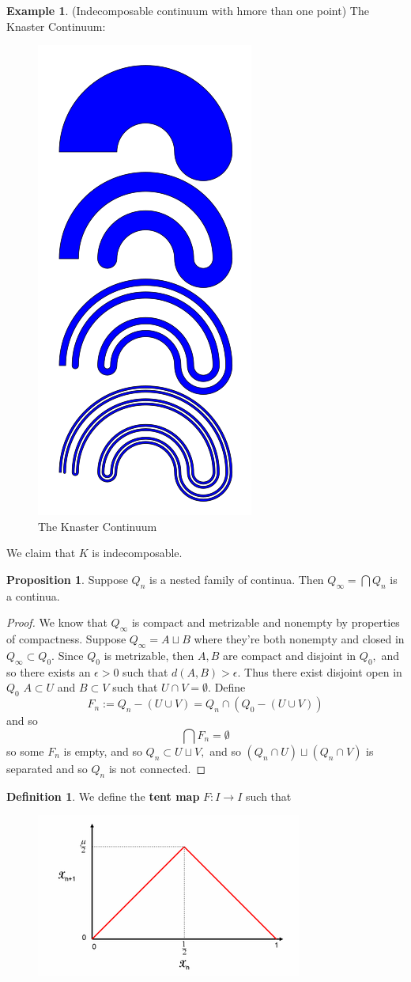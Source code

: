 \documentclass[10pt, oneside]{article}
\theoremstyle{definition}
\newtheorem{exmp}{Example}[section]
\newtheorem{defn}{Definition}
\newtheorem{prop}{Proposition}
\begin{document}
\begin{exmp}
    (Indecomposable continuum with hmore than one point)
    The Knaster Continuum:
    \begin{figure}[H]
        \centering
        \includegraphics[width=0.25\linewidth]{Images/Knaster Continuum.png}
        \caption{The Knaster Continuum}
    \end{figure}
    We claim that $K$ is indecomposable.
    \begin{prop}
        Suppose $Q_n$ is a nested family of continua. Then $Q_\infty = \bigcap Q_n$ is a continua.
    \end{prop}
    \begin{proof}
        We know that $Q_\infty$ is compact and metrizable and nonempty by properties of compactness. Suppose $Q_\infty = A \sqcup B$ where they're both nonempty and closed in $Q_\infty\subset Q_0.$ Since $Q_0$ is metrizable, then $A,B$ are compact and disjoint in $Q_0,$ and so there exists an $\epsilon>0$ such that $d(A, B) > \epsilon.$ Thus there exist disjoint open in $Q_0$  $A\subset U$ and $B\subset V$ such that $U\cap V = \emptyset.$ Define
        \[F_n := Q_n - (U\cup V) = Q_n \cap (Q_0 - (U\cup V))\] and so 
        \[\bigcap F_n = \emptyset\]
        so some $F_n$ is empty, and so $Q_n \subset U \sqcup V,$ and so $(Q_n \cap U) \sqcup (Q_n \cap V)$ is separated and so $Q_n$ is not connected.
    \end{proof}
    \begin{defn}
    We define the \textbf{tent map} $F: I \to I$ such that 
    \begin{figure}[H]
        \centering
        \includegraphics[width=0.5\linewidth]{Images/Tent Map.png}

\end{figure}
\end{defn}
\end{exmp}
\end{document}
